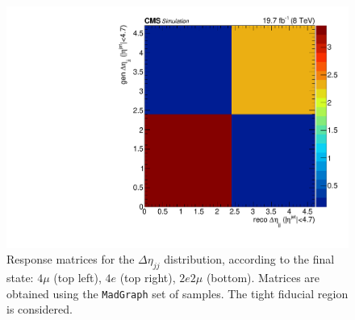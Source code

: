 \begin{figure}[hbtp]
\begin{center}
    \includegraphics[width=\cmsFigWidth]{Figures/ResMat_qqggJJ_Deta_ZZTo2e2m_st_01_fr_Mad}     
    \caption{Response matrices for the $\Delta\eta_{jj}$ distribution, according to the final state:  $4\mu$ (top left), $4e$ (top right), $2e2\mu$  (bottom). Matrices are obtained using the  \texttt{MadGraph} set of samples. The tight fiducial region is considered.} 
    \label{fig:Deta_matrices}
  \end{center}
\end{figure}
